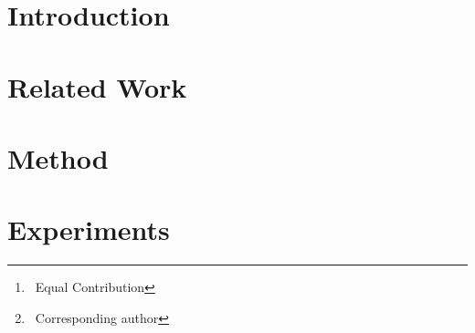 \documentclass[runningheads]{llncs}
\makeatletter
\DeclareRobustCommand\onedot{\futurelet\@let@token\@onedot}
\def\@onedot{\ifx\@let@token.\else.\null\fi\xspace}
\def\eg{\emph{e.g}\onedot} \def\Eg{\emph{E.g}\onedot}
\def\etc{\emph{etc}\onedot} \def\vs{\emph{vs}\onedot}
\makeatother
\begin{document}
\begin{abstract}
This paper tackles the unsupervised depth estimation task in indoor environments. The task is extremely challenging because of the vast areas of non-texture regions in these scenes.
These areas could overwhelm the optimization process in the commonly used unsupervised depth estimation framework proposed for outdoor environments. 
However, even when those regions are masked out, the performance is still unsatisfactory.  
In this paper, we argue that the poor performance suffers from the non-discriminative point-based matching. To this end, we propose PNet. We first extract points with large local gradients and adopt patches centered at each point as its representation. Multiview consistency loss is then defined over patches. This operation significantly improves the robustness of the network training. 
Furthermore, because those textureless regions in indoor scenes (\eg, wall, floor, roof, \etc) usually correspond to planar regions, 
we propose to leverage superpixels as a plane prior. We enforce the predicted depth to be well fitted by a plane within each superpixel.
Extensive experiments on NYUv2 and ScanNet show that our PNet outperforms existing approaches by a large margin.

\newcommand\blfootnote[1]{\begingroup
    \renewcommand\thefootnote{}\footnote{#1}\addtocounter{footnote}{-1}\endgroup
}
\blfootnote{~Equal Contribution}
\blfootnote{~Corresponding author}
\end{abstract}


\section{Introduction}


\section{Related Work}


\section{Method}


\section{Experiments}

\end{document}
